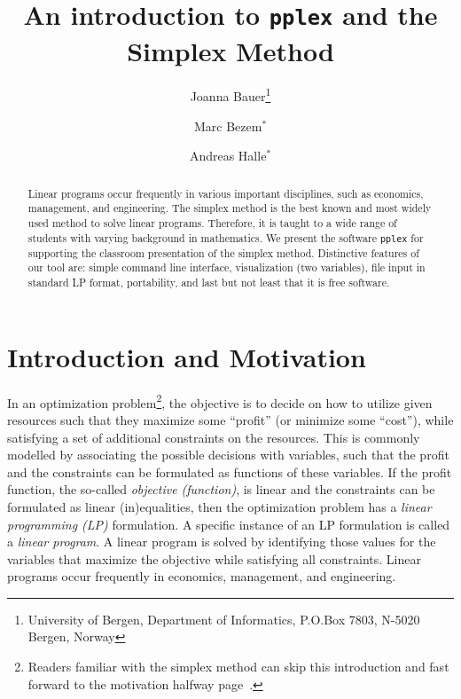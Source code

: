 \documentclass[ukenglish,a4]{article}
\begin{document}
\title{An introduction to \texttt{pplex} and the Simplex Method}

\author{
Joanna Bauer\thanks{University of Bergen, Department of Informatics, P.O.Box 7803, N-5020 Bergen, Norway}
\and
Marc Bezem$^*$
\and
Andreas Halle$^*$}

\maketitle

\begin{abstract}
Linear programs occur frequently in various important disciplines, such as economics, management, and engineering.
The simplex method is the best known and most widely used method to solve linear programs.
Therefore, it is taught to a wide range of students with varying background in mathematics.
We present the software \texttt{pplex} for supporting
the classroom presentation of the simplex method.
Distinctive features of our tool are: 
simple command line interface,
visualization (two variables), 
file input in standard LP format,
portability, 
and last but not least that it is free software.
\end{abstract}

\section{Introduction and Motivation}\label{sec:intro}

In an optimization problem\footnote{Readers familiar with the simplex method can skip this 
introduction and fast forward to the motivation halfway page~\pageref{motivation}.}, 
the objective is to decide on how to utilize given resources such that they maximize some ``profit''
(or minimize some ``cost''), while satisfying a set of additional constraints on the resources.
This is commonly modelled by associating the possible decisions with variables, such that the profit 
and the constraints can be formulated as functions of these variables. 
If the profit function, the so-called \emph{objective (function)}, is linear and the constraints can be formulated as linear (in)equalities, then the optimization problem has a \emph{linear programming (LP)} formulation. A specific instance of an LP formulation is called a \emph{linear program}.
A linear program is solved by identifying those values for the variables that maximize the objective while satisfying all constraints.
Linear programs occur frequently in economics, management, and engineering.
\end{document}
